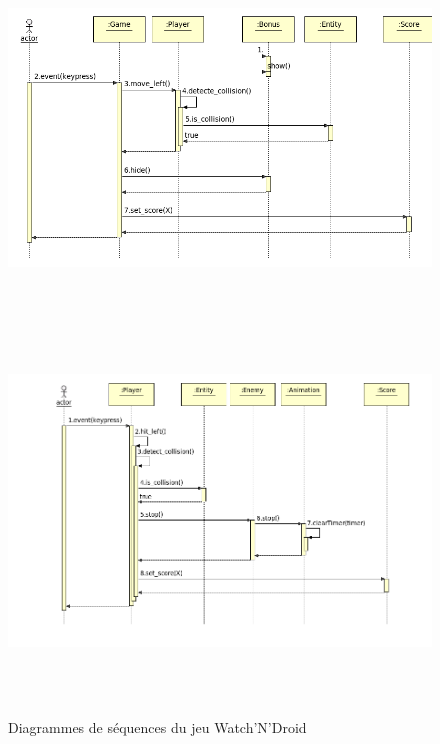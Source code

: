 \begin{figure}[h]
 \centering
 \includegraphics[height=9.5cm]{../umls/UML_images/WatchNDroid/sequence} \hfill
 \includegraphics[height=10cm]{../umls/UML_images/WatchNDroid/sequence2} \hfill
 \caption{Diagrammes de séquences du jeu Watch'N'Droid}
\end{figure}


\clearpage

